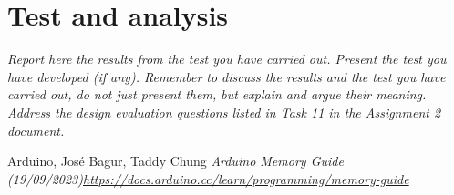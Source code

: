 \documentclass[a4paper, english]{article}
\numberwithin{equation}{section}
\begin{document}
\section{Test and analysis}
\emph{Report here the results from the test you have carried out. Present the test you have developed (if any). Remember to discuss the results and the test you have carried out, do not just present them, but explain and argue their meaning. Address the design evaluation questions listed in Task 11 in the Assignment 2 document.}
\begin{thebibliography}{1}
    Arduino, José Bagur, Taddy Chung \emph{Arduino Memory Guide (19/09/2023)\newline \href{https://docs.arduino.cc/learn/programming/memory-guide}{https://docs.arduino.cc/learn/programming/memory-guide}}
\end{thebibliography}

%
%




%
\end{document}
